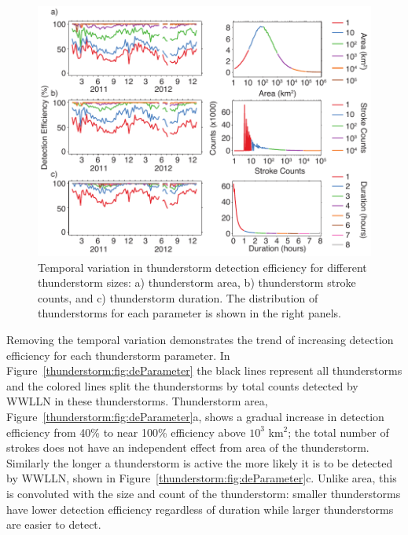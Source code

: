 \begin{figure}[ht!]
   \centering
   \includegraphics[scale=1]{thunderstorm/Figures/deBroken.pdf}
   \caption{Temporal variation in thunderstorm detection efficiency for different thunderstorm sizes: a) thunderstorm area, b) thunderstorm stroke counts, and c) thunderstorm duration.
           The distribution of thunderstorms for each parameter is shown in the right panels.}
   \label{thunderstorm:fig:deBroken}
\end{figure}

Removing the temporal variation demonstrates the trend of increasing detection efficiency for each thunderstorm parameter.
In Figure~\ref{thunderstorm:fig:deParameter} the black lines represent all thunderstorms and the colored lines split the thunderstorms by total counts detected by WWLLN in these thunderstorms.
Thunderstorm area, Figure~\ref{thunderstorm:fig:deParameter}a, shows a gradual increase in detection efficiency from 40\% to near 100\% efficiency above $10^3$ km$^2$; the total number of strokes does not have an independent effect from area of the thunderstorm.
Similarly the longer a thunderstorm is active the more likely it is to be detected by WWLLN, shown in Figure~\ref{thunderstorm:fig:deParameter}c.
Unlike area, this is convoluted with the size and count of the thunderstorm: smaller thunderstorms have lower detection efficiency regardless of duration while larger thunderstorms are easier to detect.


